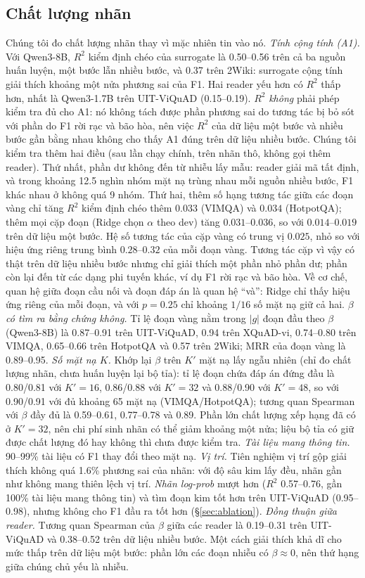 \documentclass[11pt]{article}
\begin{document}
\subsection{Chất lượng nhãn}
\label{sec:label-quality}
Chúng tôi đo chất lượng nhãn thay vì mặc nhiên tin vào nó.
\emph{Tính cộng tính (A1).} Với Qwen3-8B, $R^2$ kiểm định chéo của surrogate là 0.50--0.56 trên cả ba nguồn huấn
luyện, một bước lẫn nhiều bước, và 0.37 trên 2Wiki: surrogate cộng tính giải thích khoảng một nửa phương sai của
F1. Hai reader yếu hơn có $R^2$ thấp hơn, nhất là Qwen3-1.7B trên UIT-ViQuAD (0.15--0.19). $R^2$ \emph{không} phải
phép kiểm tra đủ cho A1: nó không tách được phần phương sai do tương tác bị bỏ sót với phần do F1 rời rạc và bão hòa,
nên việc $R^2$ của dữ liệu một bước và nhiều bước gần bằng nhau không cho thấy A1 đúng trên dữ liệu nhiều bước. Chúng tôi
kiểm tra thêm hai điều (sau lần chạy chính, trên nhãn thô, không gọi thêm reader). Thứ nhất, phần dư không đến từ nhiễu lấy
mẫu: reader giải mã tất định, và trong khoảng 12.5 nghìn nhóm mặt nạ trùng nhau mỗi nguồn nhiều bước, F1 khác nhau ở không quá
9 nhóm. Thứ hai, thêm số hạng tương tác giữa các đoạn vàng chỉ tăng $R^2$ kiểm định chéo thêm $0.033$ (VIMQA) và $0.034$
(HotpotQA); thêm mọi cặp đoạn (Ridge chọn $\alpha$ theo dev) tăng $0.031$--$0.036$, so với $0.014$--$0.019$ trên dữ liệu một bước.
Hệ số tương tác của cặp vàng có trung vị $0.025$, nhỏ so với hiệu ứng riêng trung bình $0.28$--$0.32$ của mỗi đoạn vàng. Tương
tác cặp vì vậy có thật trên dữ liệu nhiều bước nhưng chỉ giải thích một phần nhỏ phần dư; phần còn lại đến từ các dạng phi
tuyến khác, ví dụ F1 rời rạc và bão hòa. Về cơ chế, quan hệ giữa đoạn cầu nối và đoạn đáp án là quan hệ ``và'': Ridge chỉ
thấy hiệu ứng riêng của mỗi đoạn, và với $p=0.25$ chỉ khoảng $1/16$ số mặt nạ giữ cả hai.
\emph{$\beta$ có tìm ra bằng chứng không.} Tỉ lệ đoạn vàng nằm trong $|g|$ đoạn đầu theo $\beta$ (Qwen3-8B) là
0.87--0.91 trên UIT-ViQuAD, 0.94 trên XQuAD-vi, 0.74--0.80 trên VIMQA, 0.65--0.66 trên HotpotQA và 0.57 trên 2Wiki;
MRR của đoạn vàng là 0.89--0.95.
\emph{Số mặt nạ $K$.} Khớp lại $\beta$ trên $K'$ mặt nạ lấy ngẫu nhiên (chỉ đo chất lượng nhãn, chưa huấn luyện lại bộ
tỉa): tỉ lệ đoạn chứa đáp án đứng đầu là 0.80/0.81 với $K'=16$, 0.86/0.88 với $K'=32$ và 0.88/0.90 với $K'=48$, so với
0.90/0.91 với đủ khoảng 65 mặt nạ (VIMQA/HotpotQA); tương quan Spearman với $\beta$ đầy đủ là 0.59--0.61, 0.77--0.78 và
0.89. Phần lớn chất lượng xếp hạng đã có ở $K'=32$, nên chi phí sinh nhãn có thể giảm khoảng một nửa; liệu bộ tỉa có giữ
được chất lượng đó hay không thì chưa được kiểm tra.
\emph{Tài liệu mang thông tin.} 90--99\% tài liệu có F1 thay đổi theo mặt nạ.
\emph{Vị trí.} Tiên nghiệm vị trí gộp giải thích không quá 1.6\% phương sai của nhãn: với độ sâu kim lấy đều,
nhãn gần như không mang thiên lệch vị trí.
\emph{Nhãn log-prob} mượt hơn ($R^2$ 0.57--0.76, gần 100\% tài liệu mang thông tin) và tìm đoạn kim tốt hơn
trên UIT-ViQuAD (0.95--0.98), nhưng không cho F1 đầu ra tốt hơn (\S\ref{sec:ablation}).
\emph{Đồng thuận giữa reader.} Tương quan Spearman của $\beta$ giữa các reader là 0.19--0.31 trên UIT-ViQuAD và
0.38--0.52 trên dữ liệu nhiều bước. Một cách giải thích khả dĩ cho mức thấp trên dữ liệu một bước: phần lớn các
đoạn nhiễu có $\beta\approx0$, nên thứ hạng giữa chúng chủ yếu là nhiễu.
\end{document}
